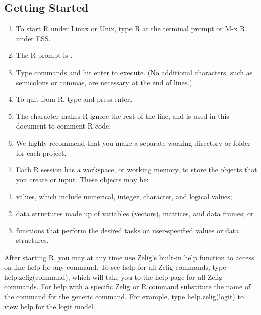 \documentclass[letterpaper,10pt,english]{sphinxmanual}
\begin{document}
\subsection{Getting Started}
\label{3_data_analysis:getting-started}\begin{enumerate}
\item {} 
To start R under Linux or Unix, type R at the terminal prompt or M-x R under ESS.

\item {} 
The R prompt is \code{\textgreater{}}.

\item {} 
Type commands and hit enter to execute. (No additional characters, such as semicolons or commas, are necessary at the end of lines.)

\item {} 
To quit from R, type  and press enter.

\item {} 
The \code{\#} character makes R ignore the rest of the line, and is used in this document to comment R code.

\item {} 
We highly recommend that you make a separate working directory or folder for each project.

\item {} 
Each R session has a workspace, or working memory, to store the objects that you create or input. These objects may be:

\end{enumerate}
\begin{enumerate}
\item {} 
values, which include numerical, integer, character, and logical values;

\item {} 
data structures made up of variables (vectors), matrices, and data frames; or

\item {} 
functions that perform the desired tasks on user-specified values or data structures.

\end{enumerate}

After starting R, you may at any time use Zelig's built-in help function to access on-line help for any command. To see help for all Zelig commands, type help.zelig(command), which will take you to the help page for all Zelig commands. For help with a specific Zelig or R command substitute the name of the command for the generic command. For example, type help.zelig(logit) to view help for the logit model.
\end{document}
